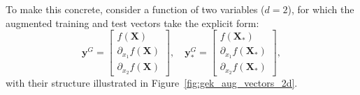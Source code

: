 \documentclass[12pt]{article}
\begin{document}
To make this concrete, consider a function of two variables ($d = 2$), for which the augmented training and test vectors take the explicit form:
\begin{equation}
	\label{eqn:gek_aug_vectors_2d}
	\mathbf{y}^{G} = \begin{bmatrix} f(\mathbf{X}) \\ \partial_{x_1} f(\mathbf{X}) \\ \partial_{x_2} f(\mathbf{X}) \end{bmatrix}, \quad
	\mathbf{y}^{G}_* = \begin{bmatrix} f(\mathbf{X}_*) \\ \partial_{x_1} f(\mathbf{X}_*) \\ \partial_{x_2} f(\mathbf{X}_*) \end{bmatrix},
\end{equation}
with their structure illustrated in Figure~\ref{fig:gek_aug_vectors_2d}.
\end{document}
